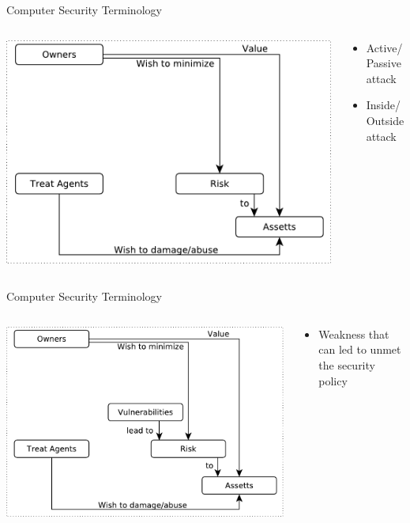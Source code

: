 \documentclass{beamer}
\begin{document}
\begin{frame}{Computer Security Terminology}
\begin{columns}[onlytextwidth]
    \begin{column}{0.6\textwidth}
\includegraphics[width=1\linewidth]{term-3}
  \end{column}
    \begin{column}{0.4\textwidth}
  \begin{itemize}
  \item Active/Passive attack
  \item Inside/Outside attack
  \end{itemize}
  \end{column}
\end{columns}
\end{frame}

\begin{frame}{Computer Security Terminology}
\begin{columns}[onlytextwidth]
    \begin{column}{0.6\textwidth}
\includegraphics[width=1\linewidth]{term-4}
  \end{column}
    \begin{column}{0.4\textwidth}
  \begin{itemize}
  \item Weakness that can led to unmet the security policy
  \end{itemize}
  \end{column}
\end{columns}
\end{frame}
\end{document}
